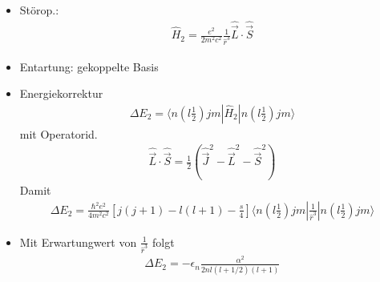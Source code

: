 \documentclass[10pt,article,colorback,accentcolor=tud9d]{scrartcl}
\begin{document}
\begin{itemize}
	\item Störop.:
    \begin{align}
    \hat{H}_2=\frac{e^2}{2m^2c^2}\frac{1}{\hat{r}^3}\hat{\vec{L}}\cdot\hat{\vec{S}}
    \end{align}
  \item Entartung: gekoppelte Basis
  \item Energiekorrektur 
    \begin{align}
    \Delta E_2=\langle n(l\frac{1}{2})jm|\hat{H}_2|n(l\frac{1}{2})jm\rangle
    \end{align}
    mit Operatorid.
    \begin{align}
    \hat{\vec{L}}\cdot\hat{\vec{S}}=\frac{1}{2}\left(\hat{\vec{J}}^2-\hat{\vec{L}}^2-\hat{\vec{S}}^2\right)
    \end{align}
    Damit
    \begin{align}
    \Delta E_2=\frac{\hbar^2e^2}{4m^2c^2}\left[j(j+1)-l(l+1)-\frac{s}{4}\right]\langle n(l\frac{1}{2})jm|\frac{1}{\hat{r}^3}|n(l\frac{1}{2})jm\rangle
    \end{align}
  \item Mit Erwartungwert von $\frac{1}{\hat{r}^3}$ folgt
    \begin{align}
    \Delta E_2=-\epsilon_n\frac{\alpha^2}{2nl(l+1/2)(l+1)}
    \end{align}
\end{itemize}
\end{document}
